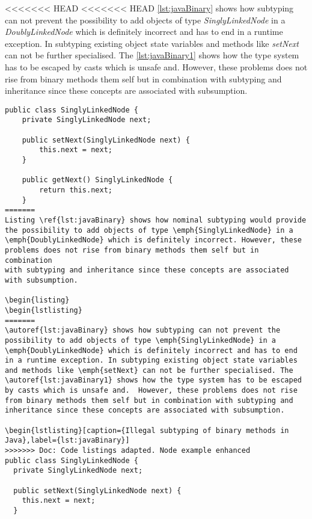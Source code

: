 <<<<<<< HEAD
<<<<<<< HEAD
\autoref{lst:javaBinary} shows how subtyping can not prevent the
possibility to add objects of type \emph{SinglyLinkedNode} in a
\emph{DoublyLinkedNode} which is definitely incorrect and has to end
in a runtime exception. In subtyping existing object state variables
and methods like \emph{setNext} can not be further specialised. The
\autoref{lst:javaBinary1} shows how the type system has to be escaped
by casts which is unsafe and.	However, these problems does not rise
from binary methods them self but in combination with subtyping and
inheritance since these concepts are associated with subsumption.

\begin{lstlisting}[caption={Illegal subtyping of binary methods in Java},label={lst:javaBinary}]
public class SinglyLinkedNode {
	private SinglyLinkedNode next;

	public setNext(SinglyLinkedNode next) {
		this.next = next;
	}

	public getNext() SinglyLinkedNode {
		return this.next;
	}
=======
Listing \ref{lst:javaBinary} shows how nominal subtyping would provide
the possibility to add objects of type \emph{SinglyLinkedNode} in a
\emph{DoublyLinkedNode} which is definitely incorrect. However, these
problems does not rise from binary methods them self but in combination
with subtyping and inheritance since these concepts are associated
with subsumption.

\begin{listing}
\begin{lstlisting}
=======
\autoref{lst:javaBinary} shows how subtyping can not prevent the
possibility to add objects of type \emph{SinglyLinkedNode} in a
\emph{DoublyLinkedNode} which is definitely incorrect and has to end
in a runtime exception. In subtyping existing object state variables
and methods like \emph{setNext} can not be further specialised. The
\autoref{lst:javaBinary1} shows how the type system has to be escaped
by casts which is unsafe and.  However, these problems does not rise
from binary methods them self but in combination with subtyping and
inheritance since these concepts are associated with subsumption.

\begin{lstlisting}[caption={Illegal subtyping of binary methods in Java},label={lst:javaBinary}]
>>>>>>> Doc: Code listings adapted. Node example enhanced
public class SinglyLinkedNode {
  private SinglyLinkedNode next;

  public setNext(SinglyLinkedNode next) {
    this.next = next;
  }


\end{lstlisting}
